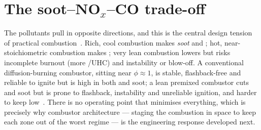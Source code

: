 \section{The soot--NO\texorpdfstring{$_x$}{x}--CO trade-off}

The pollutants pull in opposite directions, and this is the central design tension of practical combustion~\cite{lecture12,lecture13}. Rich, cool combustion makes \emph{soot} and ; hot, near-stoichiometric combustion makes ; very lean combustion lowers  but risks incomplete burnout (more /UHC) and instability or blow-off. A conventional diffusion-burning combustor, sitting near $\phi\approx1$, is stable, flashback-free and reliable to ignite but is high in both  and soot; a lean premixed combustor cuts  and soot but is prone to flashback, instability and unreliable ignition, and harder to keep  low~\cite{lecture13}. There is no operating point that minimises everything, which is precisely why combustor architecture --- staging the combustion in space to keep each zone out of the worst regime --- is the engineering response developed next.
